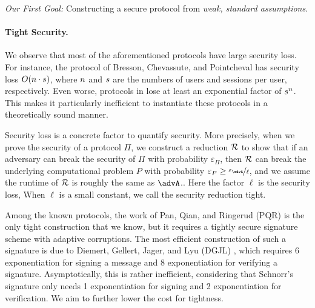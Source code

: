 \begin{displayquote}
	\emph{Our First Goal:} Constructing a secure \introGAKE protocol from \textit{weak, standard assumptions}.
\end{displayquote} 


\paragraph{Tight Security.}
We observe that most of the aforementioned protocols have large security loss. For instance, the protocol of Bresson, Chevassute, and Pointcheval \cite{EC:BreChePoi02} has security loss $O(n \cdot s)$, where $n$ and $s$ are the numbers of users and sessions per user, respectively. Even worse, protocols in \cite{CCS:BCPQ01,CANS:LiYan13} lose at least an exponential factor of $s^{n}$.
This makes it particularly inefficient to instantiate these protocols in a theoretically sound manner.

Security loss is a concrete factor to quantify security. More precisely, when we prove the security of a protocol $\Pi$, we construct a reduction $\mathcal{R}$ to show that if an adversary can break the security of $\Pi$ with probability $\varepsilon_{\Pi}$, then $\mathcal{R}$ can break the underlying computational problem $P$ with probability $\varepsilon_{P} \geq \nicefrac{\varepsilon_{\advA}}{\ell}$, and we assume the runtime of $\mathcal{R}$ is roughly the same as $\advA$.. 
Here the factor $\ell$ is the security loss, 
When $\ell$ is a small constant, we call the security reduction tight. 

Among the known \introGAKE protocols, the work of Pan, Qian, and Ringerud (PQR) \cite{JC:PanQiaRin22} is the only tight construction that we know, but it requires a tightly secure signature scheme with adaptive corruptions. The most efficient construction of such a signature is due to Diemert, Gellert, Jager, and Lyu (DGJL) \cite{PKC:DGJL21}, which 
requires 6 exponentiation for signing a message and 8 exponentiation for verifying a signature. Asymptotically, this is rather inefficient, considering that Schnorr's signature only needs 1 exponentiation for signing and 2 exponentiation for verification.
We aim to further lower the cost for tightness.

